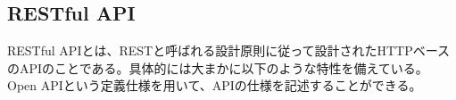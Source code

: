 \documentclass[../../../main]{subfiles}
\begin{document}
    \subsection{RESTful API}\label{subsec:phraseology-restful-api}

    RESTful APIとは、RESTと呼ばれる設計原則に従って設計されたHTTPベースのAPIのことである。具体的には大まかに以下のような特性を備えている。
    Open APIという定義仕様を用いて、APIの仕様を記述することができる。
\end{document}

